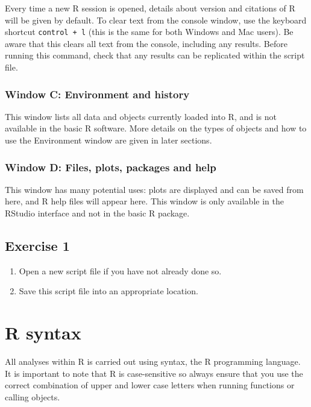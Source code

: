 \documentclass[
  letterpaper,
  DIV=11,
  numbers=noendperiod]{scrreprt}
\providecommand{\tightlist}{%
  \setlength{\itemsep}{0pt}\setlength{\parskip}{0pt}}\usepackage{longtable,booktabs,array}
\begin{document}
Every time a new R session is opened, details about version and
citations of R will be given by default. To clear text from the console
window, use the keyboard shortcut \texttt{control\ +\ l} (this is the
same for both Windows and Mac users). Be aware that this clears all text
from the console, including any results. Before running this command,
check that any results can be replicated within the script file.

\subsection{Window C: Environment and
history}\label{window-c-environment-and-history}

This window lists all data and objects currently loaded into R, and is
not available in the basic R software. More details on the types of
objects and how to use the Environment window are given in later
sections.

\subsection{Window D: Files, plots, packages and
help}\label{window-d-files-plots-packages-and-help}

This window has many potential uses: plots are displayed and can be
saved from here, and R help files will appear here. This window is only
available in the RStudio interface and not in the basic R package.

\section{Exercise 1}\label{exercise-1}

\begin{enumerate}
\def\labelenumi{\arabic{enumi}.}
\tightlist
\item
  Open a new script file if you have not already done so.
\item
  Save this script file into an appropriate location.
\end{enumerate}


\chapter{R syntax}\label{r-syntax}

All analyses within R is carried out using syntax, the R programming
language. It is important to note that R is case-sensitive so always
ensure that you use the correct combination of upper and lower case
letters when running functions or calling objects.
\end{document}
